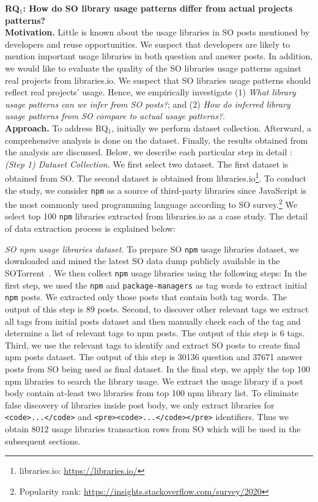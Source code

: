 \documentclass[paper]{ieice}
\newcommand{\RQOne}{\textbf{RQ$_1$: How do SO library usage patterns differ from actual projects patterns?}}
\newcommand{\PSOne}{\textit{What library usage patterns can we infer from SO posts?}}
\newcommand{\PSTwo}{\textit{How do inferred library usage patterns from SO compare to actual usage patterns?}}
\begin{document}
\noindent\RQOne
\\

\noindent\textbf{Motivation. }Little is known about the usage libraries in SO posts mentioned by developers and reuse opportunities. We suspect that developers are likely to mention important usage libraries in both question and answer posts. In addition, we would like to evaluate the quality of the SO libraries usage patterns against real projects from libraries.io. We suspect that SO libraries usage patterns should reflect real projects' usage. Hence, we empirically investigate (1) \PSOne; and (2) \PSTwo.
\\

\noindent\textbf{Approach. }To address RQ$_1$, initially we perform dataset collection.  Afterward, a comprehensive analysis is done on the dataset. Finally, the results obtained from the analysis are discussed. Below, we describe each particular step in detail :
\\

\noindent\textit{(Step 1) Dataset Collection.} We first select two dataset. The first dataset is obtained from SO. The second dataset is obtained from libraries.io\footnote{libraries.io: \url{https://libraries.io/}}.
To conduct the study, we consider \texttt{npm} as a source of third-party libraries since JavaScript is the most commonly used programming language according to SO survey.\footnote{Popularity rank: \url{https://insights.stackoverflow.com/survey/2020}}
We select top 100 \texttt{npm} libraries extracted from libraries.io as a case study. The detail of data extraction process is explained below:

\textit{SO npm usage libraries dataset.}
\label{subsec:DatasetD1}
To prepare SO \texttt{npm} usage libraries dataset, we downloaded and mined the latest SO data dump publicly available in the SOTorrent~\cite{Baltes2018SoTorrent}. We then collect \texttt{npm} usage libraries using the following steps: In the first step, we used the \texttt{npm} and \texttt{package-managers} as tag words to extract initial \texttt{npm} posts. We extracted only those posts that contain both tag words. The output of this step is 89 posts. Second, to discover other relevant tags we extract all tags from initial posts dataset and then manually check each of the tag and determine a list of relevant tags to npm posts. The output of this step is 6 tags. Third, we use the relevant tags to identify and extract SO posts to create final npm posts dataset. The output of  this step is 30136 question and 37671 answer posts from SO being used as final dataset. In the final step,  we apply the top 100 npm libraries to search the library usage. We extract the usage library if a post body contain at-least two libraries from top 100 npm library list. To eliminate false discovery of libraries inside post body, we only extract libraries for \texttt{<code>...</code>} and \texttt{<pre><code>...</code></pre>} identifiers. Thus we obtain 8012 usage libraries transaction rows from SO which will be used in the subsequent sections.
\end{document}
